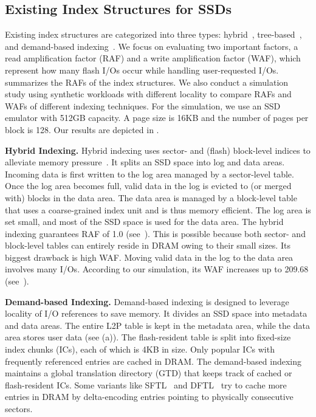 \subsection{Existing Index Structures for SSDs}
Existing index structures are categorized into three types: 
hybrid~\cite{fast,superblockFTL, last, flexibleFTL}, 
tree-based~\cite{ubifs,uftl,utree}, and demand-based
indexing~\cite{dftl,sftl,tpftl}.
We focus on evaluating two important factors,
a read amplification factor (RAF) and a write amplification factor (WAF),
which represent how many flash I/Os occur 
while handling user-requested I/Os.
 summarizes the RAFs of the index structures.
We also conduct a simulation study using synthetic workloads with
different locality to compare RAFs and WAFs of different indexing techniques.
For the simulation, we use an SSD emulator with 512GB capacity.
A page size is 16KB and the number of pages per block is 128.
Our results are depicted in .

\textbf{Hybrid Indexing.}
Hybrid indexing uses sector- and (flash) block-level indices to alleviate memory
pressure~\cite{fast,superblockFTL, last, flexibleFTL}.  
It splits an SSD space into log and data areas. 	
Incoming data is first written to the log area
managed by a sector-level table.
Once the log area becomes full, valid data in the log is evicted to
(or merged with) blocks in the data area.
The data area is managed by a block-level table
that uses a coarse-grained index unit and is thus memory efficient.
The log area is set small,
and most of the SSD space is used for the data area.
The hybrid indexing guarantees RAF of 1.0
(see~).
This is possible because
both sector- and block-level tables can entirely reside in DRAM
owing to their small sizes.
Its biggest drawback is high WAF. Moving valid data 
in the log to the data area involves many
I/Os. According to our simulation, its WAF increases up to 209.68 
(see~).

\textbf{Demand-based Indexing.}
Demand-based indexing is designed to leverage locality of I/O references to
save memory.  It divides an SSD space into metadata and data areas.
The entire L2P table is kept in the metadata area, 
while the data area stores user data (see (a)).  
The flash-resident table is split into
fixed-size index chunks (ICs), each of which is 4KB in size.
Only popular ICs with frequently referenced entries are cached in DRAM.  The
demand-based indexing maintains a global translation directory (GTD) that keeps
track of cached or flash-resident ICs.  
Some variants like SFTL~\cite{sftl} and DFTL~\cite{tpftl} 
try to cache more entries in DRAM
by delta-encoding entries pointing to physically
consecutive sectors.

